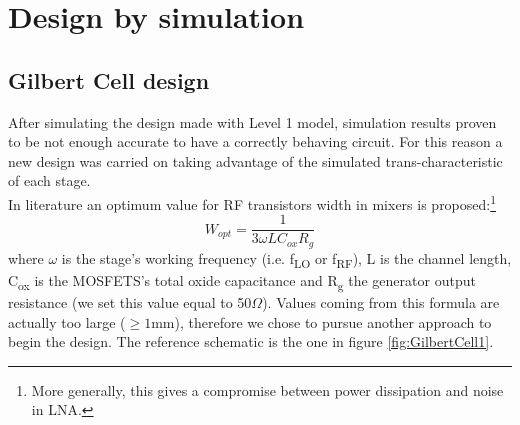 \section{Design by simulation}

\subsection{Gilbert Cell design}
After simulating the design made with Level 1 model, simulation results proven to be not enough accurate to have a correctly behaving circuit.
For this reason a new design was carried on taking advantage of the simulated trans-characteristic of each stage.\\
In literature an optimum value for RF transistors width in mixers is proposed:\footnote{More generally, this gives a compromise between power dissipation and noise in LNA.}
\begin{equation}
W_{opt}=\frac{1}{3\omega L C_{ox} R_{g}}
\end{equation}
where $\omega$ is the stage's working frequency (i.e. f\textsubscript{LO} or f\textsubscript{RF}), L is the channel length, C\textsubscript{ox} is the MOSFETS's total oxide capacitance and R\textsubscript{g} the generator output resistance (we set this value equal to 50$\Omega$). Values coming from this formula are actually too large ($\ge1$mm), therefore we chose to pursue another approach to begin the design.
The reference schematic is the one in figure \ref{fig:GilbertCell1}.
